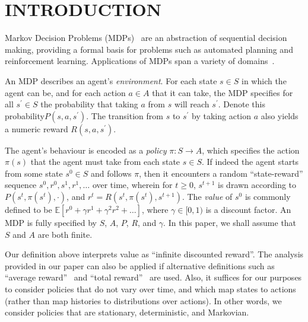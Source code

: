 \section{INTRODUCTION}
\label{sec:introduction}

Markov Decision Problems (MDPs)~\cite{Bellman:1957,Puterman:1994} are an abstraction of sequential decision making, providing a formal basis for problems such as automated planning and reinforcement learning. Applications of MDPs span a variety of domains~\cite{White:1985,White:1988,Feinberg+Schwarz:2002}.

An MDP describes an agent's \textit{environment}. For each state $s \in S$ in which the agent can be, and for each action $a \in A$ that it can take, the MDP specifies for all $s^{\prime} \in S$ the probability that taking $a$ from $s$ will reach $s^{\prime}$. Denote this probability$ P(s, a, s^{\prime})$. The transition from $s$ to $s^{\prime}$ by taking action $a$ also yields a numeric reward $R(s, a, s^{\prime})$. %

The agent's behaviour is encoded as a \textit{policy} $\pi: S \to A$, which specifies the action $\pi(s)$ that the agent must take from each state $s \in S$. If indeed the agent starts from some state $s^{0} \in S$ and follows $\pi$, then it encounters a random ``state-reward'' sequence $s^{0}, r^{0}, s^{1}, r^{1}, \dots$ over time, wherein for $t \geq 0$, $s^{t + 1}$ is drawn according to $P(s^{t}, \pi(s^{t}), \cdot)$, and $r^{t} = R(s^{t}, \pi(s^{t}), s^{t + 1})$. The \textit{value} of $s^{0}$ is commonly defined to be $\mathbb{E}[r^{0} + \gamma r^{1} + \gamma^{2} r^{2} + \dots]$, where $\gamma \in [0, 1)$ is a discount factor. An MDP is fully specified by $S$, $A$, $P$, $R$, and $\gamma$. In this paper, we shall assume that $S$ and $A$ are both finite.

Our definition above interprets value as ``infinite discounted reward''. The analysis provided in our paper can also be applied if alternative definitions such as ``average reward''~\cite{Mahadevan:1996}
and ``total reward''~\cite{Fearnley:2010} are used. Also, it suffices for our purposes to consider policies that do not vary over time, and which map states to actions (rather than map histories to distributions over actions). In other words, we consider policies that are stationary, deterministic, and Markovian.



